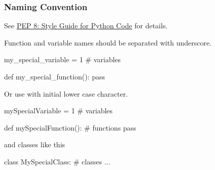 \documentclass[hyperref={pdfpagelabels=false},table]{beamer}
\begin{document}
\begin{frame}[fragile]\frametitle{Naming Convention}

  See \href{https://www.python.org/dev/peps/pep-0008/}{PEP 8: Style Guide for Python Code} for details.

  Function and variable names should be separated with underscore.
  \begin{python}
    my_special_variable = 1 # variables 

    def my_special_function():
      pass
  \end{python}

  \pause 
  Or use  with initial lower case character. 
  \begin{python}
    mySpecialVariable = 1    # variables 

    def mySpecialFunction(): # functions
      pass
  \end{python}

  and classes like this 

  \begin{python}
    class MySpecialClass:    # classes
        ...
  \end{python}

\end{frame}
\end{document}
